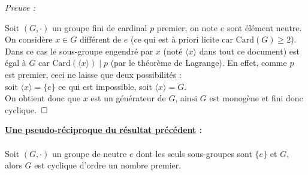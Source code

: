 \documentclass{article}
\begin{document}
\textit{Preuve :}

Soit $(G,\cdot)$ un groupe fini de cardinal $p$ premier, on note $e$ sont élément neutre.\\
On considère $x \in G$ différent de $e$ (ce qui est à priori licite car $\text{Card}(G) \geq 2$).\\
Dans ce cas le sous-groupe engendré par $x$ (noté $\langle x \rangle$ dans tout ce document) est égal à $G$ car $\text{Card}(\langle x \rangle) \mid p$ (par le théorème de Lagrange). En effet, comme $p$ est premier, ceci ne laisse que deux possibilités :\\
soit $\langle x \rangle = \{e\}$ ce qui est impossible, soit $\langle x \rangle = G$.\\
On obtient donc que $x$ est un générateur de $G$, ainsi $G$ est monogène et fini donc cyclique. $\thinspace \square$

\vspace{1cm}

\begin{tcolorbox}[colback=gray!10, colframe=black, boxrule=1.5pt, arc=0pt,
                  left=4pt, right=4pt, top=4pt, bottom=4pt,
                  leftrule=1.5pt, rightrule=0pt, toprule=0pt, bottomrule=0pt]
 \textbf{\underline{Une pseudo-réciproque du résultat précédent} :} \\
\\
 Soit $(G, \cdot)$ un groupe de neutre $e$ dont les seuls sous-groupes sont $\{e\}$ et $G$, alors $G$ est cyclique d'ordre un nombre premier.
\end{tcolorbox}
\end{document}
